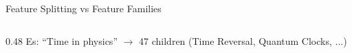 \documentclass[aspectratio=169, 10pt]{beamer}
\begin{document}
\begin{frame}{Feature Splitting vs Feature Families}
\begin{columns}
\begin{column}{0.48\textwidth}
            \vspace{0.2cm}
            {\small Es: ``Time in physics'' $\to$ 47 children (Time Reversal, Quantum Clocks, ...)}
        \end{column}
    \end{columns}
\end{frame}
\end{document}
